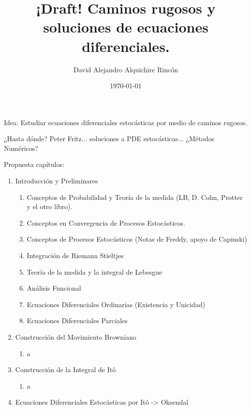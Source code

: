 \documentclass[12pt, twocolumns]{book}
\title{¡Draft! Caminos rugosos y soluciones de ecuaciones diferenciales.}
\author{David Alejandro Alquichire Rincón}
\date{\today}
\begin{document}
\maketitle

Idea: Estudiar ecuaciones diferenciales estocásticas por medio de caminos rugosos.

¿Hasta dónde? Peter Fritz... soluciones a PDE estocásticas... ¿Métodos Numéricos?

Propuesta capítulos:


\begin{enumerate}

\item Introducción y Preliminares

\begin{enumerate}

	\item Conceptos de Probabilidad y Teoría de la medida (LB, D. Cohn, Protter y el otro libro). 
	\item Conceptos en Convergencia de Procesos Estocásticos.
	\item Conceptos de Procesos Estocásticos (Notas de Freddy, apoyo de Capinski) 

	\item Integración de Riemann Stieltjes
	\item Teoría de la medida y la integral de Lebesgue
	\item Análisis Funcional
	\item Ecuaciones Diferenciales Ordinarias (Existencia y Unicidad)
	\item Ecuaciones Diferenciales Parciales

\end{enumerate}

\item Construcción del Movimiento Browniano

\begin{enumerate}
	\item a
\end{enumerate}


\item Construcción de la Integral de Itô

\begin{enumerate}
	\item a
\end{enumerate}


\item Ecuaciones Diferenciales Estocásticas por Itô -> Oksendal

\begin{enumerate}


\end{enumerate}
\end{enumerate}
\end{document}
